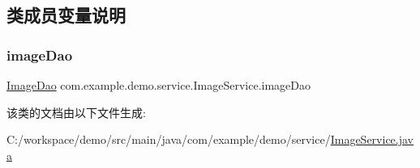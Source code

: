 \subsection{类成员变量说明}
\mbox{\label{classcom_1_1example_1_1demo_1_1service_1_1_image_service_a13a57fdc4ac6c733be65dc6efa534c5a}} 
\subsubsection{\texorpdfstring{image\+Dao}{imageDao}}
{\footnotesize\ttfamily \mbox{\hyperlink{interfacecom_1_1example_1_1demo_1_1dao_1_1_image_dao}{Image\+Dao}} com.\+example.\+demo.\+service.\+Image\+Service.\+image\+Dao\hspace{0.3cm}{\ttfamily [package]}}



该类的文档由以下文件生成\+:\begin{DoxyCompactItemize}
\item 
C\+:/workspace/demo/src/main/java/com/example/demo/service/\mbox{\hyperlink{_image_service_8java}{Image\+Service.\+java}}\end{DoxyCompactItemize}
